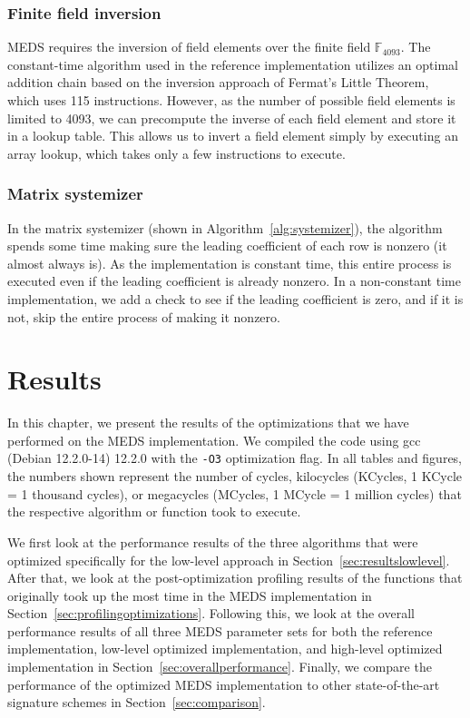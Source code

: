 \documentclass[11pt,a4paper]{report}
\theoremstyle{definition}
\begin{document}
\subsection{Finite field inversion}
MEDS requires the inversion of field elements over the finite field $\mathbb{F}_{4093}$. The constant-time algorithm used in the reference implementation utilizes an optimal addition chain based on the inversion approach of Fermat's Little Theorem, which uses 115 instructions. However, as the number of possible field elements is limited to 4093, we can precompute the inverse of each field element and store it in a lookup table. This allows us to invert a field element simply by executing an array lookup, which takes only a few instructions to execute.

\subsection{Matrix systemizer}
In the matrix systemizer (shown in Algorithm~\ref{alg:systemizer}), the algorithm spends some time making sure the leading coefficient of each row is nonzero (it almost always is). As the implementation is constant time, this entire process is executed even if the leading coefficient is already nonzero. In a non-constant time implementation, we add a check to see if the leading coefficient is zero, and if it is not, skip the entire process of making it nonzero.

\chapter{Results}
\label{ch:results}
In this chapter, we present the results of the optimizations that we have performed on the MEDS implementation. We compiled the code using gcc (Debian 12.2.0-14) 12.2.0 with the \texttt{-O3} optimization flag. In all tables and figures, the numbers shown represent the number of cycles, kilocycles (KCycles, 1 KCycle = 1 thousand cycles), or megacycles (MCycles, 1 MCycle = 1 million cycles) that the respective algorithm or function took to execute.

We first look at the performance results of the three algorithms that were optimized specifically for the low-level approach in Section~\ref{sec:resultslowlevel}. After that, we look at the post-optimization profiling results of the functions that originally took up the most time in the MEDS implementation in Section~\ref{sec:profilingoptimizations}. Following this, we look at the overall performance results of all three MEDS parameter sets for both the reference implementation, low-level optimized implementation, and high-level optimized implementation in Section~\ref{sec:overallperformance}. Finally, we compare the performance of the optimized MEDS implementation to other state-of-the-art signature schemes in Section~\ref{sec:comparison}.
\end{document}
